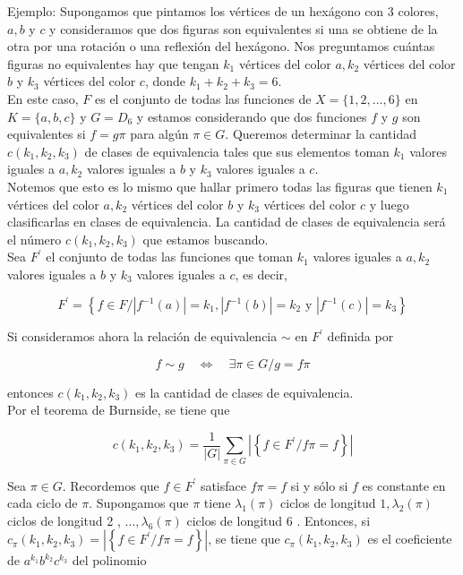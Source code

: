 \documentclass[10pt]{article}
\begin{document}
Ejemplo: Supongamos que pintamos los vértices de un hexágono con 3 colores, $a, b$ y $c$ y consideramos que dos figuras son equivalentes si una se obtiene de la otra por una rotación o una reflexión del hexágono. Nos preguntamos cuántas figuras no equivalentes hay que tengan $k_{1}$ vértices del color $a, k_{2}$ vértices del color $b$ y $k_{3}$ vértices del color $c$, donde $k_{1}+k_{2}+k_{3}=6$.\\
En este caso, $F$ es el conjunto de todas las funciones de $X=\{1,2, \ldots, 6\}$ en $K=\{a, b, c\}$ y $G=D_{6}$ y estamos considerando que dos funciones $f$ y $g$ son equivalentes si $f=g \pi$ para algún $\pi \in G$. Queremos determinar la cantidad $c\left(k_{1}, k_{2}, k_{3}\right)$ de clases de equivalencia tales que sus elementos toman $k_{1}$ valores iguales a $a, k_{2}$ valores iguales a $b$ y $k_{3}$ valores iguales a $c$.\\
Notemos que esto es lo mismo que hallar primero todas las figuras que tienen $k_{1}$ vértices del color $a, k_{2}$ vértices del color $b$ y $k_{3}$ vértices del color $c$ y luego clasificarlas en clases de equivalencia. La cantidad de clases de equivalencia será el número $c\left(k_{1}, k_{2}, k_{3}\right)$ que estamos buscando.\\
Sea $F^{\prime}$ el conjunto de todas las funciones que toman $k_{1}$ valores iguales a $a, k_{2}$ valores iguales a $b$ y $k_{3}$ valores iguales a $c$, es decir,

$$
F^{\prime}=\left\{f \in F /\left|f^{-1}(a)\right|=k_{1},\left|f^{-1}(b)\right|=k_{2} \text { y }\left|f^{-1}(c)\right|=k_{3}\right\}
$$

Si consideramos ahora la relación de equivalencia $\sim$ en $F^{\prime}$ definida por

$$
f \sim g \quad \Longleftrightarrow \quad \exists \pi \in G / g=f \pi
$$

entonces $c\left(k_{1}, k_{2}, k_{3}\right)$ es la cantidad de clases de equivalencia.\\
Por el teorema de Burnside, se tiene que

$$
c\left(k_{1}, k_{2}, k_{3}\right)=\frac{1}{|G|} \sum_{\pi \in G}\left|\left\{f \in F^{\prime} / f \pi=f\right\}\right|
$$

Sea $\pi \in G$. Recordemos que $f \in F^{\prime}$ satisface $f \pi=f$ si y sólo si $f$ es constante en cada ciclo de $\pi$. Supongamos que $\pi$ tiene $\lambda_{1}(\pi)$ ciclos de longitud $1, \lambda_{2}(\pi)$ ciclos de longitud 2 , $\ldots, \lambda_{6}(\pi)$ ciclos de longitud 6 . Entonces, si $c_{\pi}\left(k_{1}, k_{2}, k_{3}\right)=\left|\left\{f \in F^{\prime} / f \pi=f\right\}\right|$, se tiene que $c_{\pi}\left(k_{1}, k_{2}, k_{3}\right)$ es el coeficiente de $a^{k_{1}} b^{k_{2}} c^{k_{3}}$ del polinomio
\end{document}
